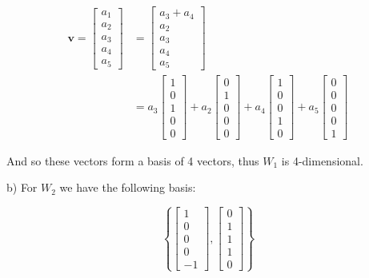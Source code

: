 \documentclass{article}
\renewcommand\vec{\mathbf}
\begin{document}
\begin{align*}
    \vec v=\begin{bmatrix}
        a_1\\a_2\\a_3\\a_4\\a_5
    \end{bmatrix}&=\begin{bmatrix}
        a_3+a_4\\a_2\\a_3\\a_4\\a_5
    \end{bmatrix}\tag{$a_1-a_3-a_4=0$}\\
    &=a_3\begin{bmatrix}
        1\\0\\1\\0\\0
    \end{bmatrix}+a_2\begin{bmatrix}
        0\\1\\0\\0\\0
    \end{bmatrix}+a_4\begin{bmatrix}
        1\\0\\0\\1\\0
    \end{bmatrix}+a_5\begin{bmatrix}
        0\\0\\0\\0\\1
    \end{bmatrix}
\end{align*}

And so these vectors form a basis of 4 vectors, thus $W_1$ is 4-dimensional.

b) For $W_2$ we have the following basis:

$$\left\{\begin{bmatrix}
    1\\0\\0\\0\\-1
\end{bmatrix},\begin{bmatrix}
    0\\1\\1\\1\\0    
\end{bmatrix}\right\}$$
\end{document}
